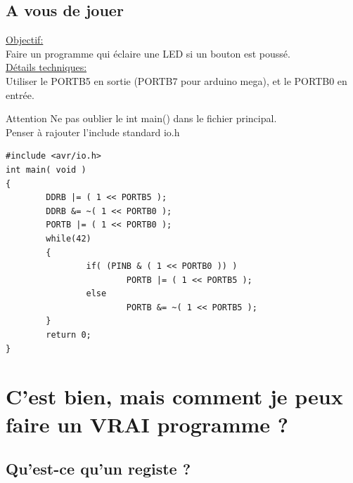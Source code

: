 \documentclass{beamer}
\begin{document}
\subsection{A vous de jouer}

\begin{frame}
  \underline{Objectif:}\\
  Faire un programme qui \'eclaire une LED si un bouton est pouss\'e.\\
  \pause
  \underline{D\'etails techniques:}\\
  Utiliser le PORTB5 en sortie (PORTB7 pour arduino mega), et le PORTB0 en entr\'ee.
  \pause
  \begin{alertblock}{Attention}
    Ne pas oublier le int main() dans le fichier principal.\\
    Penser \`a rajouter l'include standard io.h
  \end{alertblock}
\end{frame}

\lstset{language=c++} 
\lstset{commentstyle=\textit} 
\begin{lstlisting}
#include <avr/io.h>
int main( void )
{
        DDRB |= ( 1 << PORTB5 );
        DDRB &= ~( 1 << PORTB0 );
        PORTB |= ( 1 << PORTB0 );
        while(42)
        {
                if( (PINB & ( 1 << PORTB0 )) )
                        PORTB |= ( 1 << PORTB5 );
                else
                        PORTB &= ~( 1 << PORTB5 );
        }
        return 0;
}
\end{lstlisting} 

\section{C'est bien, mais comment je peux faire un VRAI programme ?}

\begin{frame}
  \tableofcontents[currentsection]
\end{frame}

\subsection{Qu'est-ce qu'un registe ?}
\end{document}
